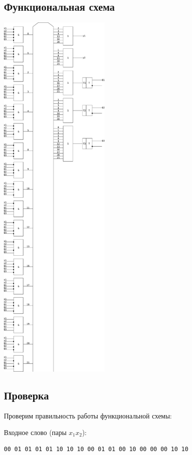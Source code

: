 \documentclass[listings]{labreport}
\begin{document}
\subsection*{Функциональная схема}

\newpage
{}
\thispagestyle{empty}
\includegraphics[width=0.41\textwidth]{stffcircuit.pdf}
\restoregeometry

\subsection*{Проверка}

Проверим правильность работы функциональной схемы:

Входное слово (пары $x_1x_2$):

\verb|00 01 01 01 01 10 10 10 00 01 01 00 10 00 00 00 10 10|
\end{document}
